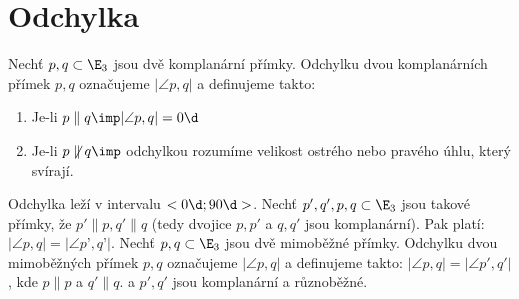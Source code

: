 
\let\braceru=\relax \let\bracelu=\relax 
\def\o#1{\setbox0=
	\hbox{$\kern2pt\overbrace{\kern-2pt#1\kern-2pt}\kern2pt$}\ht0=2.1ex\box0}
\def\to#1{\hbox{#1\rlap{\t{}}}}
\def\rad{\rm{rad}}
\def\f{\frac}
\section{Odchylka}
\Def Nechť $p,q\subset \E_3$ jsou  dvě komplanární přímky. Odchylku dvou komplanárních přímek
$p,q$ označujeme $|\angle p ,q|$ a definujeme takto:
\begin{enumerate}
	\item Je-li $p\parallel q \imp |\angle p,q| = 0\d$
	\item Je-li $p\not\parallel q \imp $ odchylkou rozumíme velikost ostrého nebo pravého úhlu, který svírají.
\end{enumerate}

\Poz Odchylka leží v intervalu $<0\d;90\d>$.
\V  Nechť $p',q', p, q \subset\E_3$ jsou takové přímky, že $p'\parallel p, q'\parallel q$ (tedy dvojice $p, p'$ a $q, q'$ jsou
komplanární). Pak platí: $|\angle p ,q| =  |\angle p’, q’|$.
\Def Nechť $p, q \subset \E_3$ jsou dvě mimoběžné přímky. Odchylku dvou mimoběžných přímek $p,q$
označujeme $|\angle p ,q|$ a definujeme takto: $|\angle p ,q| = |\angle p', q'|$, kde $p\parallel p$ a $q' \parallel q$. a $p',q'$
jsou komplanární a různoběžné.


\EndDoc


